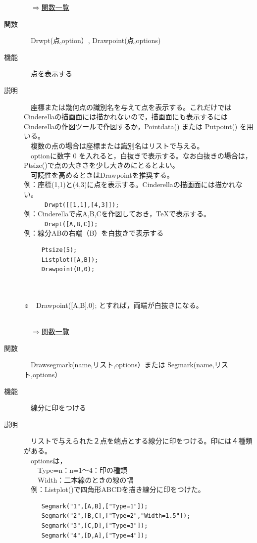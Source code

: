 \documentclass[papersize,a4paper,12pt,uplatex]{jsarticle}
\begin{document}
\begin{description}
\begin{flushright}　\hyperlink{functionlist}{$\Rightarrow$関数一覧}\end{flushright}

\hypertarget{drwpt}{}
\item[関数]　Drwpt(点,option）, Drawpoint(点,options)
\item[機能]　点を表示する
\item[説明]　座標または幾何点の識別名を与えて点を表示する。これだけではCinderellaの描画面には描かれないので，描画面にも表示するにはCinderellaの作図ツールで作図するか，Pointdata() または Putpoint() を用いる。\\
　複数の点の場合は座標または識別名はリストで与える。\\
　optionに数字 0 を入れると，白抜きで表示する。なお白抜きの場合は，Ptsize()で点の大きさを少し大きめにとるとよい。\\
　可読性を高めるときはDrawpointを推奨する。\\

例：座標(1,1)と(4,3)に点を表示する。Cinderellaの描画面には描かれない。\\
　　　\verb|Drwpt([[1,1],[4,3]]);|\\

例：Cinderellaで点A,B,Cを作図しておき，\TeX で表示する。\\
　　　\verb|Drwpt([A,B,C]); |\\

例：線分ABの右端（B）を白抜きで表示する
\begin{verbatim}
　　　Ptsize(5);
　　　Listplot([A,B]);
　　　Drawpoint(B,0);
\end{verbatim}
　\\
　　　　\\
※　Drawpoint([A,B],0);  とすれば，両端が白抜きになる。\\
\\
\begin{flushright}　\hyperlink{functionlist}{$\Rightarrow$関数一覧}\end{flushright}

\hypertarget{drawsegmark}{}
\item[関数]　Drawsegmark(name,リスト,options）または Segmark(name,リスト,options）
\item[機能]　線分に印をつける
\item[説明]　リストで与えられた２点を端点とする線分に印をつける。印には４種類がある。\\
　optionsは，\\
　　Type=n：n=1〜4：印の種類\\
　　Width：二本線のときの線の幅\\
　例：Listplot()で四角形ABCDを描き線分に印をつけた。
\begin{verbatim}
　　　Segmark("1",[A,B],["Type=1"]); 
　　　Segmark("2",[B,C],["Type=2","Width=1.5"]);
　　　Segmark("3",[C,D],["Type=3"]);
　　　Segmark("4",[D,A],["Type=4"]);
\end{verbatim}
　　　　


\end{description}
\end{document}
